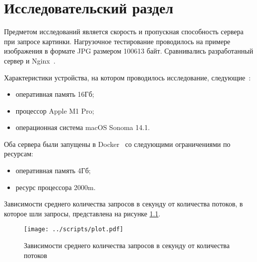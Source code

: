 \chapter{Исследовательский раздел}

Предметом исследований является скорость и пропускная способность сервера при запросе картинки. Нагрузочное тестирование проводилось на примере изображения в формате JPG размером 100613 байт. Сравнивались разработанный сервер и Nginx~\cite{dejonghe2020nginx}.

Характеристики устройства, на котором проводилось исследование, следующие~\cite{macbook}:

\begin{itemize}
	\item оперативная память 16Гб;
	\item процессор Apple M1 Pro;
	\item операционная система macOS Sonoma 14.1.
\end{itemize}

Оба сервера были запущены в Docker~\cite{docker} со следующими ограничениями по ресурсам:

\begin{itemize}
	\item оперативная память 4Гб;
	\item ресурс процессора 2000m.
\end{itemize}

Зависимости среднего количества запросов в секунду от количества потоков, в которое шли запросы, представлена на рисунке \ref{img:plot}.

\begin{figure}[h!]
    \centering
    \texttt{[image: ../scripts/plot.pdf]}
    \caption{Зависимости среднего количества запросов в секунду от количества потоков}
    \label{img:plot}
\end{figure}